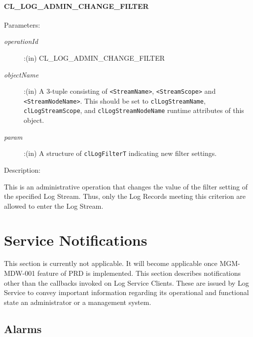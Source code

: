 \begin{flushleft}
\subsubsection{CL\_\-LOG\_\-ADMIN\_\-CHANGE\_\-FILTER}
\begin{Desc}
\item[Parameters:]
\begin{description}
\item[{\em operationId}]:(in) CL\_\-LOG\_\-ADMIN\_\-CHANGE\_\-FILTER
\item[{\em objectName}]:(in) A 3-tuple consisting of {\tt{<StreamName>}}, {\tt{<StreamScope>}} and {\tt{<StreamNodeName>}}. This should be set
to {\tt{clLogStreamName}}, {\tt{clLogStreamScope}}, and {\tt{clLogStreamNodeName}} runtime attributes of this object.
\item[{\em param}]:(in) A structure of {\tt{clLogFilterT}} indicating new filter settings.
\end{description}
\end{Desc}
\begin{Desc}
 \item[Description:]
\end{Desc}
This is an administrative operation that changes the value of the filter setting of the specified Log Stream. Thus, only the Log Records 
meeting this criterion are allowed to enter the Log Stream.





\chapter{Service Notifications}
This section is currently not applicable. It will become applicable once MGM-MDW-001 feature of PRD is implemented.
This section describes notifications other than the callbacks invoked on Log Service Clients. These are issued by Log Service to convey important 
information regarding its operational and functional state an administrator or a management system.



\section{Alarms}

\end{flushleft}
